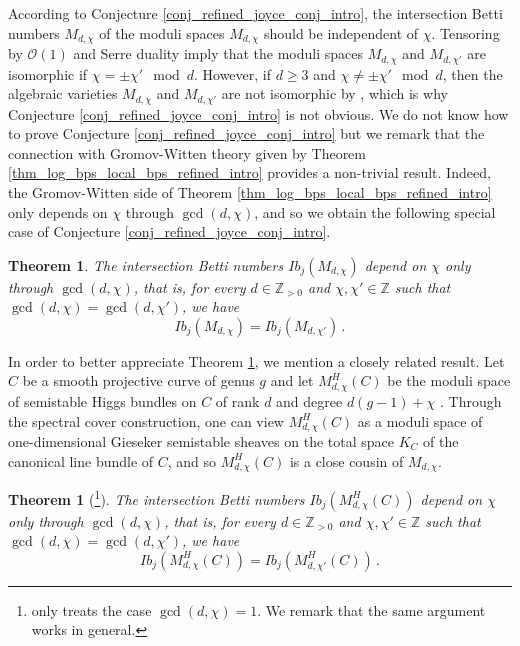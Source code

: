 \documentclass[11pt,letterpaper]{amsart}
\newtheorem{thm}[defn]{Theorem}
\newcommand\Z{\mathbb Z}
\newcommand\cO{\mathcal O}
\begin{document}
According to Conjecture \ref{conj_refined_joyce_conj_intro}, the intersection Betti numbers $M_{d,\chi}$ of the moduli 
spaces $M_{d,\chi}$ should be independent of $\chi$.
Tensoring by $\cO(1)$ and Serre duality imply that the moduli spaces $M_{d,\chi}$ and 
$M_{d,\chi'}$ are isomorphic if $\chi=\pm \chi' \mod d$. 
However, if $d \geqslant 3$ and $\chi \neq \pm \chi' \mod d$, then the algebraic varieties 
$M_{d,\chi}$ and $M_{d,\chi'}$ 
are not isomorphic by \cite[Theorem 8.1]{woolf2013nef}, which is why Conjecture \ref{conj_refined_joyce_conj_intro} is not obvious. We do not know how to prove Conjecture 
\ref{conj_refined_joyce_conj_intro} but we remark that the connection with Gromov-Witten theory given by Theorem 
\ref{thm_log_bps_local_bps_refined_intro} provides a non-trivial result. Indeed, the Gromov-Witten side of 
Theorem \ref{thm_log_bps_local_bps_refined_intro}
only depends on $\chi$ through $\gcd(d,\chi)$, and so
we obtain the following special case of Conjecture 
\ref{conj_refined_joyce_conj_intro}.

\begin{thm} \label{thm_chi_independence_intro}
The intersection Betti numbers $Ib_j(M_{d,\chi})$ depend on 
$\chi$ only through $\gcd(d,\chi)$, that is, for every $d\in \Z_{>0}$ and $\chi,\chi' \in \Z$ such that 
$\gcd(d,\chi)=\gcd(d,\chi')$, we have 
\[ Ib_j(M_{d,\chi})=Ib_j(M_{d,\chi'})\,.\]
\end{thm}


In order to better appreciate Theorem \ref{thm_chi_independence_intro}, we mention a closely related result. 
Let $C$ be a smooth projective curve of genus $g$ and let $M_{d,\chi}^{H}(C)$ be the moduli space of semistable Higgs bundles on $C$ of rank $d$ and degree $d(g-1)+\chi$ \cite{MR887284}. 
Through the spectral cover construction, one can view $M_{d,\chi}^{H}(C)$ as a moduli space of one-dimensional Gieseker semistable sheaves on the total space $K_C$ of the canonical line bundle of $C$, and so $M_{d,\chi}^{H}(C)$ is a close cousin of $M_{d,\chi}$.

\begin{thm}[\cite{MR2453601}\footnote{\cite{MR2453601}
only treats the case $\gcd(d,\chi)=1$. We remark that the same argument works in general.}]\label{thm_higgs_moduli}
The intersection Betti numbers $Ib_j(M_{d,\chi}^H(C))$ depend on 
$\chi$ only through $\gcd(d,\chi)$, that is, for every $d\in \Z_{>0}$ and $\chi,\chi' \in \Z$ such that 
$\gcd(d,\chi)=\gcd(d,\chi')$, we have 
\[ Ib_j(M_{d,\chi}^H(C))=Ib_j(M_{d,\chi'}^H(C))\,.\]
\end{thm}
\end{document}
